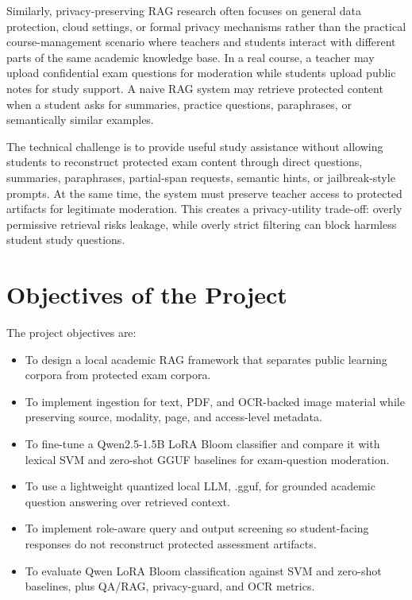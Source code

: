 Similarly, privacy-preserving RAG research often focuses on general data protection, cloud settings, or formal privacy mechanisms rather than the practical course-management scenario where teachers and students interact with different parts of the same academic knowledge base. In a real course, a teacher may upload confidential exam questions for moderation while students upload public notes for study support. A naive RAG system may retrieve protected content when a student asks for summaries, practice questions, paraphrases, or semantically similar examples.

The technical challenge is to provide useful study assistance without allowing students to reconstruct protected exam content through direct questions, summaries, paraphrases, partial-span requests, semantic hints, or jailbreak-style prompts. At the same time, the system must preserve teacher access to protected artifacts for legitimate moderation. This creates a privacy-utility trade-off: overly permissive retrieval risks leakage, while overly strict filtering can block harmless student study questions.

\section{Objectives of the Project}

The project objectives are:
\begin{itemize}
    \item To design a local academic RAG framework that separates public learning corpora from protected exam corpora.
    \item To implement ingestion for text, PDF, and OCR-backed image material while preserving source, modality, page, and access-level metadata.
    \item To fine-tune a Qwen2.5-1.5B LoRA Bloom classifier and compare it with lexical SVM and zero-shot GGUF baselines for exam-question moderation.
    \item To use a lightweight quantized local LLM, \qwenmodel{}.gguf, for grounded academic question answering over retrieved context.
    \item To implement role-aware query and output screening so student-facing responses do not reconstruct protected assessment artifacts.
    \item To evaluate Qwen LoRA Bloom classification against SVM and zero-shot baselines, plus QA/RAG, privacy-guard, and OCR metrics.
\end{itemize}

